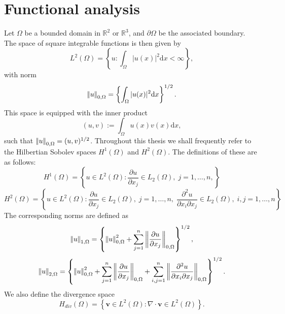 \section{Functional analysis}
Let $\Omega$ be a bounded domain in $\mathbb{R}^{2}$ or $\mathbb{R}^{3}$, and $\partial\Omega$ be the associated boundary. The space of square integrable functions is then given by
\begin{equation*}
L^{2}(\Omega)  = \left\lbrace  u : \int_{\Omega} |u(x)|^{2} \mbox{d}x < \infty \right\rbrace,
\end{equation*}
with norm
\begin{equation*}
{\left\vert\kern-0.25ex\left\vert u \right\vert\kern-0.25ex\right\vert}_{0,\Omega}  = \left\lbrace \int_{\Omega} |u(x)|^{2} \mbox{d}x  \right\rbrace^{1/2}.
\end{equation*}
This space is equipped with the inner product
\begin{equation*}
(u,v)  :=  \int_{\Omega} u(x)v(x) \mbox{d}x,
\end{equation*}
such that ${\left\vert\kern-0.25ex\left\vert u \right\vert\kern-0.25ex\right\vert}_{0,\Omega}=(u,v)^{1/2}$. Throughout this thesis we shall frequently refer to the Hilbertian Sobolev spaces
$H^{1}(\Omega)$ and $H^{2}(\Omega)$. The definitions of these are as follows:
%
\begin{equation*}
H^{1}(\Omega)  = \left\lbrace  u  \in L^{2}(\Omega): \frac{\partial u }{\partial x_{j}} \in L_{2}(\Omega) , \; j=1,\ldots ,n, \right\rbrace
\end{equation*}
\begin{equation*}
H^{2}(\Omega)  = \left\lbrace  u  \in L^{2}(\Omega): \frac{\partial u }{\partial x_{j}} \in L_{2}(\Omega) , \; j=1,\ldots ,n, \;  \frac{\partial^{2} u }{\partial x_{i} \partial x_{j}} \in L_{2}(\Omega), \; i,j=1,\ldots ,n \right\rbrace
\end{equation*}
The corresponding norms are defined as
\begin{equation*}
{\left\vert\kern-0.25ex\left\vert u \right\vert\kern-0.25ex\right\vert}_{1,\Omega}  = \left\lbrace {\left\vert\kern-0.25ex\left\vert u \right\vert\kern-0.25ex\right\vert}_{0,\Omega}^{2} + \sum_{j=1}^{n} {\left\vert\kern-0.25ex\left\vert \frac{\partial u }{\partial x_{j}} \right\vert\kern-0.25ex\right\vert}_{0,\Omega}   \right\rbrace^{1/2},
\end{equation*}
\begin{equation*}
{\left\vert\kern-0.25ex\left\vert u \right\vert\kern-0.25ex\right\vert}_{2,\Omega}  = \left\lbrace {\left\vert\kern-0.25ex\left\vert u \right\vert\kern-0.25ex\right\vert}_{0,\Omega}^{2} + \sum_{j=1}^{n} {\left\vert\kern-0.25ex\left\vert \frac{\partial u }{\partial x_{j}} \right\vert\kern-0.25ex\right\vert}_{0,\Omega}  + \sum_{i,j=1}^{n} {\left\vert\kern-0.25ex\left\vert \frac{\partial^{2} u }{\partial x_{i} \partial x_{j}} \right\vert\kern-0.25ex\right\vert}_{0,\Omega}  \right\rbrace^{1/2}.
\end{equation*}
We also define the divergence space 
\begin{equation*}
H_{div}(\Omega)=\left\lbrace \boldsymbol{v}\in L^{2}(\Omega): \nabla \cdot \boldsymbol{v} \in L^{2}(\Omega) \right\rbrace.
\end{equation*}
